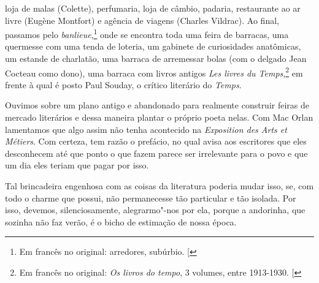 loja de malas (Colette), perfumaria, loja de câmbio, padaria,
restaurante ao ar livre (Eugène Montfort) e agência de viagens (Charles
Vildrac). Ao final, passamos pelo \emph{banlieue},\footnote{Em francês no original: arredores, subúrbio. {[}\versal{N. T.}{]}} onde se encontra toda
uma feira de barracas, uma quermesse com uma tenda de loteria, um
gabinete de curiosidades anatômicas, um estande de charlatão, uma
barraca de arremessar bolas (com o delgado Jean Cocteau como dono), uma
barraca com livros antigos \emph{Les livres du Temps},\footnote{Em francês no original:
\emph{Os livros do tempo}, 3 volumes, entre 1913-1930. {[}\versal{N. T.}{]}} em frente à
qual é posto Paul Souday, o crítico literário do \emph{Temps}.

Ouvimos sobre um plano antigo e abandonado para realmente construir
feiras de mercado literários e dessa maneira plantar o próprio poeta
nelas. Com Mac Orlan lamentamos que algo assim não tenha acontecido na
\emph{Exposition des Arts et Métiers}. Com certeza, tem razão o
prefácio, no qual avisa aos escritores que eles desconhecem até que
ponto o que fazem parece ser irrelevante para o povo e que um dia eles
teriam que pagar por isso.

Tal brincadeira engenhosa com as coisas da literatura poderia mudar
isso, se, com todo o charme que possui, não permanecesse tão particular
e tão isolada. Por isso, devemos, silenciosamente, alegrarmo"-nos por
ela, porque a andorinha, que sozinha não faz verão, é o bicho de
estimação de nossa época.
